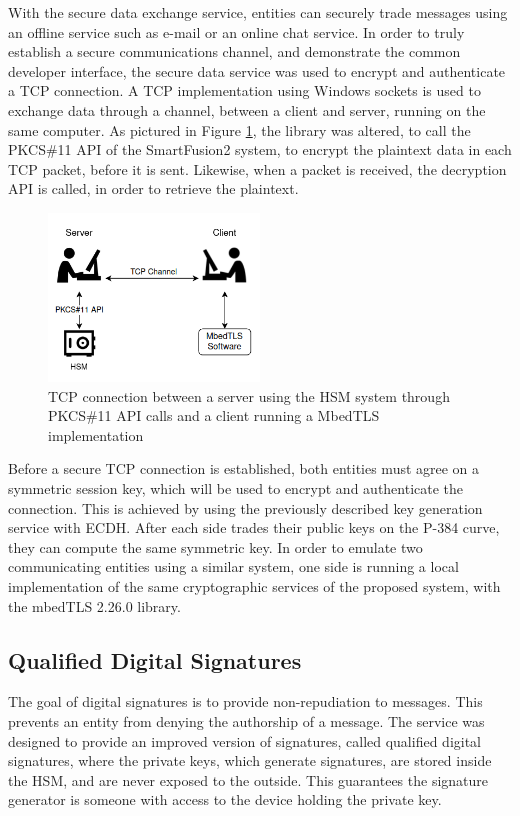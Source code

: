 With the secure data exchange service, entities can securely trade messages using an offline service such as e-mail or an online chat service.
In order to truly establish a secure communications channel, and demonstrate the common developer interface, the secure data service was used to encrypt and authenticate a TCP connection. A TCP implementation using Windows sockets is used to exchange data through a channel, between a client and server, running on the same computer. As pictured in Figure \ref{fig:implementation:tcp}, the library was altered, to call the PKCS\#11 API of the SmartFusion2 system, to encrypt the plaintext data in each TCP packet, before it is sent. Likewise, when a packet is received, the decryption API is called, in order to retrieve the plaintext.
\begin{figure}[h!]
	\centering
	\includegraphics[width=0.5\textwidth]{./Images/tcp.png}
	\caption{TCP connection between a server using the HSM system through PKCS\#11 API calls and a client running a MbedTLS implementation}
	\label{fig:implementation:tcp}
\end{figure}
Before a secure TCP connection is established, both entities must agree on a symmetric session key, which will be used to encrypt and authenticate the connection. This is achieved by using the previously described key generation service with ECDH. After each side trades their public keys on the P-384 curve, they can compute the same symmetric key. In order to emulate two communicating entities using a similar system, one side is running a local implementation of the same cryptographic services of the proposed system, with the mbedTLS 2.26.0 library.

\subsection{Qualified Digital Signatures}\label{chap:implementation:services:signatures}

The goal of digital signatures is to provide non-repudiation to messages. This prevents an entity from denying the authorship of a message. 
The service was designed to provide an improved version of signatures, called qualified digital signatures, where the private keys, which generate signatures, are stored inside the HSM, and are never exposed to the outside.
This guarantees the signature generator is someone with access to the device holding the private key.

